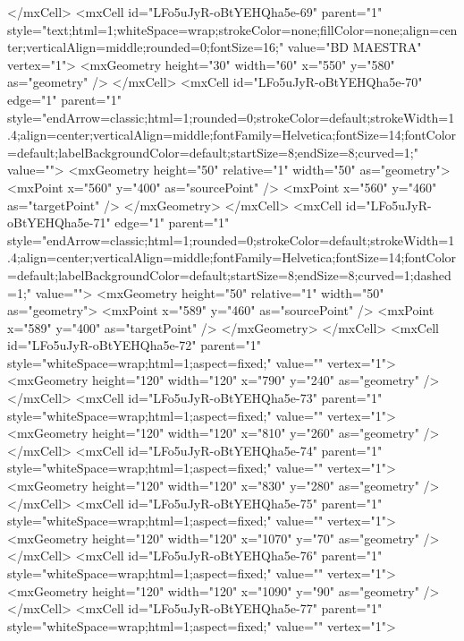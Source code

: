         </mxCell>
        <mxCell id="LFo5uJyR-oBtYEHQha5e-69" parent="1" style="text;html=1;whiteSpace=wrap;strokeColor=none;fillColor=none;align=center;verticalAlign=middle;rounded=0;fontSize=16;" value="BD MAESTRA" vertex="1">
          <mxGeometry height="30" width="60" x="550" y="580" as="geometry" />
        </mxCell>
        <mxCell id="LFo5uJyR-oBtYEHQha5e-70" edge="1" parent="1" style="endArrow=classic;html=1;rounded=0;strokeColor=default;strokeWidth=1.4;align=center;verticalAlign=middle;fontFamily=Helvetica;fontSize=14;fontColor=default;labelBackgroundColor=default;startSize=8;endSize=8;curved=1;" value="">
          <mxGeometry height="50" relative="1" width="50" as="geometry">
            <mxPoint x="560" y="400" as="sourcePoint" />
            <mxPoint x="560" y="460" as="targetPoint" />
          </mxGeometry>
        </mxCell>
        <mxCell id="LFo5uJyR-oBtYEHQha5e-71" edge="1" parent="1" style="endArrow=classic;html=1;rounded=0;strokeColor=default;strokeWidth=1.4;align=center;verticalAlign=middle;fontFamily=Helvetica;fontSize=14;fontColor=default;labelBackgroundColor=default;startSize=8;endSize=8;curved=1;dashed=1;" value="">
          <mxGeometry height="50" relative="1" width="50" as="geometry">
            <mxPoint x="589" y="460" as="sourcePoint" />
            <mxPoint x="589" y="400" as="targetPoint" />
          </mxGeometry>
        </mxCell>
        <mxCell id="LFo5uJyR-oBtYEHQha5e-72" parent="1" style="whiteSpace=wrap;html=1;aspect=fixed;" value="" vertex="1">
          <mxGeometry height="120" width="120" x="790" y="240" as="geometry" />
        </mxCell>
        <mxCell id="LFo5uJyR-oBtYEHQha5e-73" parent="1" style="whiteSpace=wrap;html=1;aspect=fixed;" value="" vertex="1">
          <mxGeometry height="120" width="120" x="810" y="260" as="geometry" />
        </mxCell>
        <mxCell id="LFo5uJyR-oBtYEHQha5e-74" parent="1" style="whiteSpace=wrap;html=1;aspect=fixed;" value="" vertex="1">
          <mxGeometry height="120" width="120" x="830" y="280" as="geometry" />
        </mxCell>
        <mxCell id="LFo5uJyR-oBtYEHQha5e-75" parent="1" style="whiteSpace=wrap;html=1;aspect=fixed;" value="" vertex="1">
          <mxGeometry height="120" width="120" x="1070" y="70" as="geometry" />
        </mxCell>
        <mxCell id="LFo5uJyR-oBtYEHQha5e-76" parent="1" style="whiteSpace=wrap;html=1;aspect=fixed;" value="" vertex="1">
          <mxGeometry height="120" width="120" x="1090" y="90" as="geometry" />
        </mxCell>
        <mxCell id="LFo5uJyR-oBtYEHQha5e-77" parent="1" style="whiteSpace=wrap;html=1;aspect=fixed;" value="" vertex="1">
